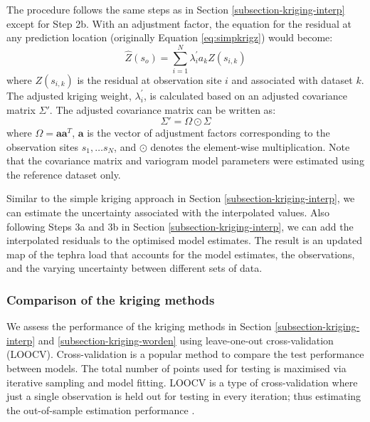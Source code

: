 \documentclass[a4paper,fleqn]{cas-sc}
\begin{document}
    The procedure follows the same steps as in Section \ref{subsection-kriging-interp} except for Step 2b. With an adjustment factor, the equation for the residual at any prediction location (originally Equation \ref{eq:simpkrigz}) would become:
        \begin{equation} \label{eq:simpkrig-z2}
        \hat{Z}(s_{o}) = \sum_{i=1}^{N} \lambda^{'}_{i} a_{k} Z(s_{i,k})
        \end{equation} 
    where $Z(s_{i,k})$ is the residual at observation site $i$ and associated with dataset $k$. The adjusted kriging weight, $\lambda^{'}_{i}$, is calculated based on an adjusted covariance matrix $\Sigma'$. The adjusted covariance matrix can be written as:
        \begin{equation} \label{eq:covadjust}
        \Sigma' = \Omega \odot \Sigma
        \end{equation} 
    where $\Omega = \mathbf{a}\mathbf{a}^{T}$, $\mathbf{a}$ is the vector of adjustment factors corresponding to the observation sites ${s}_{1}, \dots {s}_{N}$, and $\odot$ denotes the element-wise multiplication. Note that the covariance matrix and variogram model parameters were estimated using the reference dataset only. 
  
    Similar to the simple kriging approach in Section \ref{subsection-kriging-interp}, we can estimate the uncertainty associated with the interpolated values. Also following Steps 3a and 3b in Section \ref{subsection-kriging-interp}, we can add the interpolated residuals to the optimised model estimates. The result is an updated map of the tephra load that accounts for the model estimates, the observations, and the varying uncertainty between different sets of data.

\subsubsection{Comparison of the kriging methods}
  
    We assess the performance of the kriging methods in Section \ref{subsection-kriging-interp} and \ref{subsection-kriging-worden} using leave-one-out cross-validation (LOOCV). Cross-validation is a popular method to compare the test performance between models. The total number of points used for testing is maximised via iterative sampling and model fitting. LOOCV is a type of cross-validation where just a single observation is held out for testing in every iteration; thus estimating the out-of-sample estimation performance \citep{shao1993linear}. 
    
\end{document}

